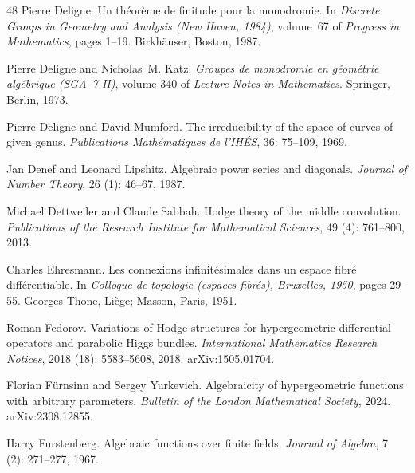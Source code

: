 \documentclass[11pt]{amsart}
\theoremstyle{definition}
\theoremstyle{remark}
\numberwithin{equation}{section}
\begin{document}
\begin{thebibliography}{48}
Pierre Deligne.
\newblock Un th{\'e}or{\`e}me de finitude pour la monodromie.
\newblock In \emph{Discrete Groups in Geometry and Analysis (New Haven, 1984)},
  volume~67 of \emph{Progress in Mathematics}, pages 1--19. Birkh{\"a}user,
  Boston, 1987.

Pierre Deligne and Nicholas~M. Katz.
\newblock \emph{Groupes de monodromie en g{\'e}om{\'e}trie alg{\'e}brique
  ({SGA}~7 {II})}, volume 340 of \emph{Lecture Notes in Mathematics}.
\newblock Springer, Berlin, 1973.

Pierre Deligne and David Mumford.
\newblock The irreducibility of the space of curves of given genus.
\newblock \emph{Publications Math{\'e}matiques de l'IH{\'E}S}, 36:
  75--109, 1969.

Jan Denef and Leonard Lipshitz.
\newblock Algebraic power series and diagonals.
\newblock \emph{Journal of Number Theory}, 26 (1): 46--67,
  1987.

Michael Dettweiler and Claude Sabbah.
\newblock Hodge theory of the middle convolution.
\newblock \emph{Publications of the Research Institute for Mathematical
  Sciences}, 49 (4): 761--800, 2013.

Charles Ehresmann.
\newblock Les connexions infinit{\'e}simales dans un espace fibr{\'e}
  diff{\'e}rentiable.
\newblock In \emph{Colloque de topologie (espaces fibr{\'e}s), Bruxelles,
  1950}, pages 29--55. Georges Thone, Li{\`e}ge; Masson, Paris, 1951.

Roman Fedorov.
\newblock Variations of {H}odge structures for hypergeometric differential
  operators and parabolic {H}iggs bundles.
\newblock \emph{International Mathematics Research Notices}, 2018
  (18): 5583--5608, 2018.
\newblock arXiv:1505.01704.

Florian F{\"u}rnsinn and Sergey Yurkevich.
\newblock Algebraicity of hypergeometric functions with arbitrary parameters.
\newblock \emph{Bulletin of the London Mathematical Society}, 2024.
\newblock arXiv:2308.12855.

Harry Furstenberg.
\newblock Algebraic functions over finite fields.
\newblock \emph{Journal of Algebra}, 7 (2): 271--277, 1967.


\end{thebibliography}
\end{document}
